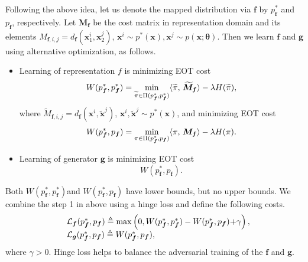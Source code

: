 Following the above idea, let us denote the mapped distribution via $\bm{f}$ by $p^{\ast}_{\bm{f}}$ and $p_{\bm{f}}$, respectively. Let $\bm{M}_{\bm{f}}$ be the cost matrix in representation domain and its elements $M_{\bm{f},{i,j}} = d_{\bm{f}}(\bm{x}^{i}_1, \bm{x}^{j}_2)$, $\bm{x}^{i} \sim p^{\ast}(\bm{x}), \bm{x}^{j}\sim p(\bm{x}; \bm{\theta})$. Then we learn $\bm{f}$ and $\bm{g}$ using alternative optimization, as follows. 
\begin{itemize}
\item Learning of representation $f$ is minimizing EOT cost
  \begin{equation}\label{eq-sim-in}
    W(p^{\ast}_{\bm{f}},p^{\ast}_{\bm{f}}) = \min_{\widetilde{\pi} \in \Pi(p^{\ast}_{\bm{f}}, p^{\ast}_{\bm{f}}) } \langle \widetilde{\pi},\,\widetilde{\bm{M}}_{\bm{f}}\rangle - \lambda H(\widetilde{\pi}),
  \end{equation}
  where $\widetilde{M}_{\bm{f}, {i,j}} = d_{\bm{f}}(\bm{x}^{i}, \tilde{\bm{x}}^{j})$, $\bm{x}^{i}, \tilde{\bm{x}}^{j} \sim p^{\ast}(\bm{x})$, and minimizing EOT cost
  \begin{equation}\label{eq-sim-ex}
    W(p^{\ast}_{\bm{f}}, p_{\bm{f}}) = \min_{{\pi} \in \Pi(p^{\ast}_{\bm{f}}, p_{\bm{f}}) } \dotp{{\pi}}{\bm{M_f}} - \la H({\pi}).\vspace{-8pt}
  \end{equation}
\item Learning of generator $\bm{g}$ is minimizing EOT cost
  \begin{equation}
    W(p^{\ast}_{\bm{f}}, p_{\bm{f}}).
  \end{equation}
\end{itemize} 
Both $W(p^{\ast}_{\bm{f}}, p^{\ast}_{\bm{f}})$and $W(p^{\ast}_{\bm{f}}, p_{\bm{f}})$ have lower bounds, but no upper bounds. 
We combine the step 1 in above using a hinge loss and define the following costs.
\begin{equation}
  \begin{array}{rl}
    &\mathcal{L}_{\bm{f}}(p^{\ast}_{\bm{f}}, p_{\bm{f}}) \triangleq \max\left(0, W(p^{\ast}_{\bm{f}}, p^{\ast}_{\bm{f}})- W(p^{\ast}_{\bm{f}}, p_{\bm{f}}) \hspace{-2pt}+\hspace{-2pt} \gamma \right),\\
    &\mathcal{L}_{\bm{g}}(p^{\ast}_{\bm{f}}, p_{\bm{f}}) \triangleq W(p^{\ast}_{\bm{f}}, p_{\bm{f}}),
  \end{array}
\end{equation}
where $\gamma>0$. Hinge loss helps to balance the adversarial training of the $\bm{f}$ and $\bm{g}$.

